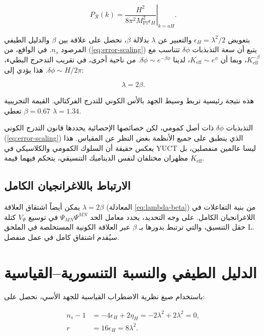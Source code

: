 \documentclass[11pt,a4paper]{article}
\theoremstyle{remark}
\newcommand{\Keff}{K_{\mathrm{eff}}}
\newcommand{\Mpl}{M_{\mathrm{Pl}}}
\newcommand{\rs}{r}
\begin{document}
	\begin{equation}
		P_{\mathcal{R}}(k) = \left. \frac{H^2}{8\pi^2 \Mpl^2 \epsilon_H} \right|_{k=aH}.
	\end{equation}
	
	بتعويض $\epsilon_H = \lambda^2/2$ والتعبير عن $\lambda$ بدلالة $\beta$، نحصل على علاقة بين $\beta$ والدليل الطيفي المرصود $n_s$. في الواقع، من (\ref{eq:error-scaling}) يتبع أن سعة التذبذبات $\delta \phi$ تتناسب مع $\Keff^{-\beta}$، وبما أن $\Keff \sim e^{\phi}$، لدينا $\delta \phi \sim e^{-\beta \phi}$. من ناحية أخرى، في تقريب التدحرج البطيء، $\delta \phi \sim H/2\pi$. هذا يؤدي إلى:
	
	\begin{equation}
		\lambda = 2\beta.
		\label{eq:lambda-beta}
	\end{equation}
	
	هذه نتيجة رئيسية تربط وسيط الجهد بالأس الكوني للتدرج الفركتالي. القيمة التجريبية $\beta = 0.67$ تعطي $\lambda = 1.34$.
	
	التذبذبات $\delta\phi$ ذات أصل كمومي، لكن خصائصها الإحصائية يحددها قانون التدرج الكوني (\ref{eq:error-scaling}) الذي ينطبق على جميع الأنظمة بغض النظر عن المقياس. هذا يعكس حقيقة أن السلوك الكمومي والكلاسيكي في YUCT ليسا عالمين منفصلين، بل مظهران مختلفان لنفس الديناميك التنسيقي، يتحكم فيهما قيمة $K_{\mathrm{eff}}$.
	
	\subsection{الارتباط باللاغرانجيان الكامل}
	
	يمكن أيضاً اشتقاق العلاقة $\lambda = 2\beta$ (المعادلة \ref{eq:lambda-beta}) من بنية التفاعلات في اللاغرانجيان الكامل. على وجه التحديد، يحدد معامل الحد $\Psi_{MN}\Psi^{MN}$ في توسيع $V_{\Psi}$ كتلة حقل التنسيق، والتي ترتبط بدورها بـ $\beta$ عبر العلاقة الكونية المستخلصة في الملحق L. سيُقدم اشتقاق كامل في عمل منفصل.
	
	\section{الدليل الطيفي والنسبة التنسورية–القياسية}
	\label{sec:predictions}
	
	باستخدام صيغ نظرية الاضطراب القياسية للجهد الأسي، نحصل على:
	
	\begin{align}
		n_s - 1 &= -4\epsilon_H + 2\eta_H = -2\lambda^2 + 2\lambda^2 = 0, \\
		\rs &= 16\epsilon_H = 8\lambda^2.
	\end{align}
	
\end{document}
